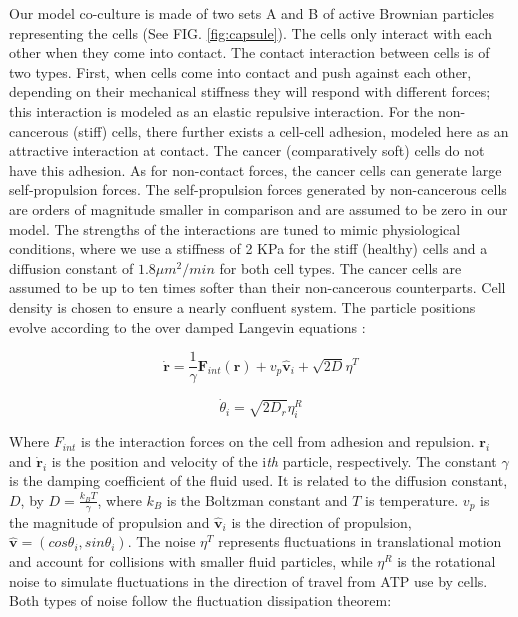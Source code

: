 \documentclass[aps,prb,twocolumn,groupedaddress,nofootinbib,floatfix]{revtex4}
\begin{document}
Our model co-culture is made of two sets A and B of active Brownian particles representing the cells (See FIG. \ref{fig:capsule}). The cells only interact with each other when 
they come into contact. The contact interaction between cells is of two types. First, when cells come into
contact and push against each other, depending on their mechanical stiffness they will respond with different forces; this interaction is modeled as an 
elastic repulsive interaction. For the non-cancerous (stiff) cells, there further exists a cell-cell adhesion,
modeled here as an attractive interaction at contact. The cancer (comparatively soft) cells do not have this adhesion. As for non-contact forces, 
the cancer cells can generate large self-propulsion forces. The self-propulsion forces generated by non-cancerous cells are orders of magnitude smaller in comparison 
and are assumed to be zero in our model. The strengths of the interactions are tuned to mimic physiological
conditions, where we use a stiffness of 2 KPa for the stiff (healthy) cells and a diffusion
constant of $1.8 \mu m^2/min$ for both cell types. The cancer cells are assumed to be up to ten times softer than their non-cancerous counterparts. 
Cell density is chosen to ensure a nearly confluent system. The particle positions evolve according to the over damped 
Langevin equations \cite{Lemons,RednerBaskaran,FilyMarchetti,Butcher}: 

\begin{equation}
  \bm{\dot{r}} = \frac{1}{\gamma}\bm{F}_{int}(\bm{r}) + v_p\hat{\bm{v}}_i+\sqrt{2D}\eta^T
\end{equation}

\begin{equation}
  \dot{\theta}_i=\sqrt{2D_r}\eta^R_i
\end{equation}

Where $F_{int}$ is the interaction forces on the cell from adhesion and repulsion.
$\bm{r}_i$ and $\dot{\bm{r}}_i$ is the position and velocity of the i\textit{th} particle, respectively.
The constant $\gamma$ is the damping coefficient of the fluid used. It is related to the
diffusion constant, $D$, by $D=\frac{k_BT}{\gamma}$, where $k_B$ is the Boltzman constant and $T$ is temperature. $v_p$ is the magnitude of propulsion
and $\bm{\hat{v}}_i$ is the direction of propulsion, $\bm{\hat{v}}=(cos\theta_i, sin\theta_i)$.
The noise $\eta^T$ represents fluctuations in translational motion and account for collisions with smaller fluid particles, while
$\eta^R$ is the rotational noise to simulate fluctuations in the direction of travel from ATP use by cells. 
Both types of noise follow the fluctuation dissipation theorem:
\end{document}

